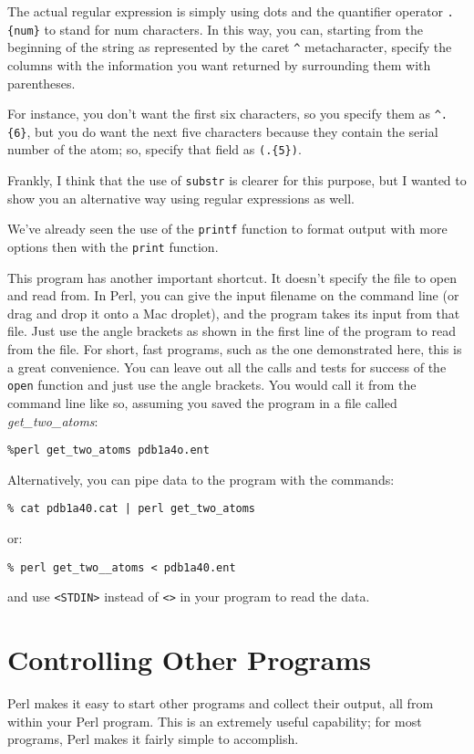 The actual regular expression is simply using dots and the quantifier operator \verb|.{num}| to stand for num characters. In this way, you can, starting from the beginning of the string as represented by the caret \verb|^| metacharacter, specify the columns with the information you want returned by surrounding them with parentheses.

For instance, you don't want the first six characters, so you specify them as \verb|^.{6}|, but you do want the next five characters because they contain the serial number of the atom; so, specify that field as \verb|(.{5})|.

Frankly, I think that the use of \verb|substr| is clearer for this purpose, but I wanted to show you an alternative way using regular expressions as well.

We've already seen the use of the \verb|printf| function to format output with more options then with the \verb|print| function.

This program has another important shortcut. It doesn't specify the file to open and read from. In Perl, you can give the input filename on the command line (or drag and drop it onto a Mac droplet), and the program takes its input from that file. Just use the angle brackets as shown in the first line of the program to read from the file. For short, fast programs, such as the one demonstrated here, this is a great convenience. You can leave out all the calls and tests for success of the \verb|open| function and just use the angle brackets. You would call it from the command line like so, assuming you saved the program in a file called \textit{get\_two\_atoms}: 

\begin{lstlisting}
%perl get_two_atoms pdb1a4o.ent
\end{lstlisting}

Alternatively, you can pipe data to the program with the commands:

\begin{lstlisting}
% cat pdb1a40.cat | perl get_two_atoms
\end{lstlisting}

or:

\begin{lstlisting}
% perl get_two__atoms < pdb1a40.ent 
\end{lstlisting}

and use \verb|<STDIN>| instead of \verb|<>| in your program to read the data. 

\section{Controlling Other Programs}
Perl makes it easy to start other programs and collect their output, all from within your Perl program. This is an extremely useful capability; for most programs, Perl makes it fairly simple to accomplish.

